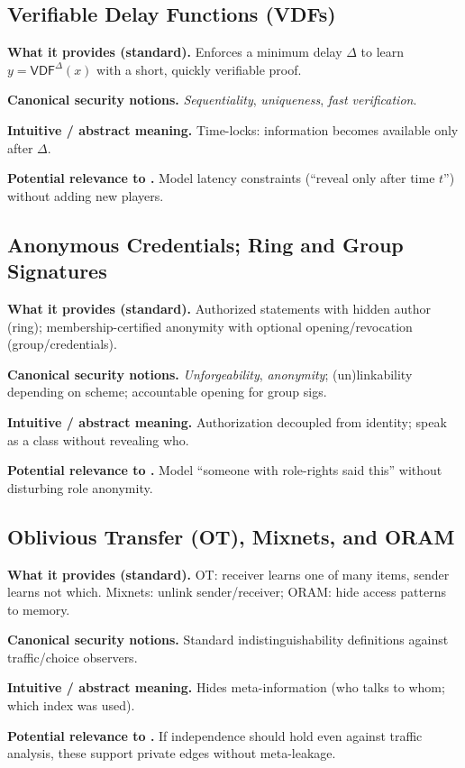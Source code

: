 \subsection{Verifiable Delay Functions (VDFs)}
\textbf{What it provides (standard).}
Enforces a minimum delay $\Delta$ to learn $y=\mathsf{VDF}^\Delta(x)$ with a
short, quickly verifiable proof.

\textbf{Canonical security notions.}
\emph{Sequentiality}, \emph{uniqueness}, \emph{fast verification}.

\textbf{Intuitive / abstract meaning.}
Time-locks: information becomes available only after $\Delta$.

\textbf{Potential relevance to \KFOL.}
Model latency constraints (“reveal only after time $t$”) without adding new players.

\subsection{Anonymous Credentials; Ring and Group Signatures}
\textbf{What it provides (standard).}
Authorized statements with hidden author (ring); membership-certified anonymity with optional opening/revocation (group/credentials).

\textbf{Canonical security notions.}
\emph{Unforgeability}, \emph{anonymity}; (un)linkability depending on scheme; accountable opening for group sigs.

\textbf{Intuitive / abstract meaning.}
Authorization decoupled from identity; speak as a class without revealing who.

\textbf{Potential relevance to \KFOL.}
Model “someone with role-rights said this” without disturbing role anonymity.

\subsection{Oblivious Transfer (OT), Mixnets, and ORAM}
\textbf{What it provides (standard).}
OT: receiver learns one of many items, sender learns not which.
Mixnets: unlink sender/receiver; ORAM: hide access patterns to memory.

\textbf{Canonical security notions.}
Standard indistinguishability definitions against traffic/choice observers.

\textbf{Intuitive / abstract meaning.}
Hides meta-information (who talks to whom; which index was used).

\textbf{Potential relevance to \KFOL.}
If independence should hold even against traffic analysis, these support private edges without meta-leakage.

